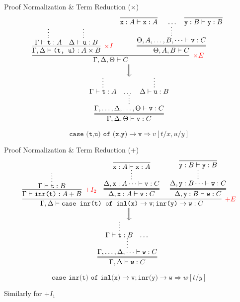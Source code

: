 \documentclass{beamer}
\newcommand{\term}[1]{\texttt{#1}}
\begin{document}
\begin{frame}{Proof Normalization \& Term Reduction ($\times$)}
	\small 
	\[
	\begin{array}{c}
		\infer[\textcolor{red}{\times E}]{\Gamma, \Delta, \Theta \vdash C}{
			\infer[\textcolor{red}{\times I}]{\Gamma, \Delta \vdash \term{(t, u)}: A \times B}{
				\infer*[]{\Gamma \vdash \term{t}: A}{}
				&
				\infer*[]{\Delta \vdash \term{u}: B}{}
			}
			&
			\infer=[]{\Theta, A, B \vdash C}{
				\infer*[]{\Theta, A, \dots, B, \dots \vdash \term{v}: C}{
				\infer[]{\term{x}: A \vdash \term{x}: A}{}
				& 
				\dots
				&
				\infer[]{\term{y}: B \vdash \term{y}: B}{}
				}
			}
		}
		\\
		{\left\Downarrow\vbox to 1em{}\right.\kern-\nulldelimiterspace}\\
		\infer=[]{\Gamma, \Delta, \Theta \vdash \term{v}: C}{
			\infer*[]{\Gamma, \dots, \Delta, \dots, \Theta \vdash \term{v}: C}{
				\infer*[]{\Gamma \vdash \term{t}: A}{}
				&
				\dots
				&
				\infer*[]{\Delta \vdash \term{u}: B}{}
			}
		}
	\end{array}
	\]

	\alert{
	\[
		\term{case (t,u) of (x,y)}\to \term{v} \Longrightarrow v[t/x, u/y]
	\]
	}
\end{frame}

\begin{frame}{Proof Normalization \& Term Reduction ($+$)}
	\small
	\[
		\begin{array}{c}
			\infer[\textcolor{red}{+ E}]{\Gamma, \Delta \vdash \term{case inr(t) of inl(x)}\to\term{v}; \term{inr(y)}\to\term{w}: C}{
				\infer[\textcolor{red}{+ I_2}]{\Gamma \vdash \term{inr(t)}: A + B}{
					\infer*[]{\Gamma \vdash \term{t}: B}{}
				}
				&
				\infer=[]{\Delta, \term{x}: A \vdash \term{v}: C}{
					\infer*[]{\Delta, \term{x}: A \dots \vdash \term{v}: C}{
					\infer[]{\term{x}: A \vdash \term{x}: A}{}
					}
				}
				&
				\infer=[]{\Delta, \term{y}: B \vdash \term{w}: C}{
					\infer*[]{\Delta, \term{y}: B \dots \vdash \term{w}: C}{
						\infer[]{\term{y}: B \vdash \term{y}: B}{}
					}
				}
			}
			\\
			{\left\Downarrow\vbox to 1em{}\right.\kern-\nulldelimiterspace}\\
			\infer=[]{\Gamma, \Delta \vdash \term{w}: C}{
				\infer*[]{\Gamma, \dots, \Delta, \dots \vdash \term{w}: C}{
					\infer*[]{\Gamma \vdash \term{t}: B}{}
					&
					\dots
				}
			}
		\end{array}
	\]

	\alert{
	\[
		\term{case inr(t) of inl(x)}\to\term{v}; \term{inr(y)}\to\term{w} \Longrightarrow w[t/y]
	\]
	}

	\vfill
	\begin{flushright}
		Similarly for $+ I_1$
	\end{flushright}
\end{frame}
\end{document}
